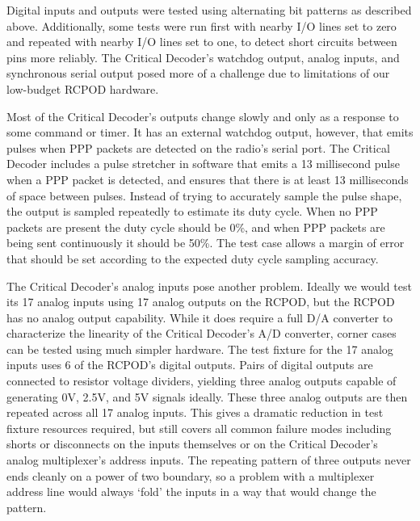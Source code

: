 \documentclass[letterpaper,twocolumn]{article}
\begin{document}
Digital inputs and outputs were tested using alternating bit patterns as described above. Additionally, some
tests were run first with nearby I/O lines set to zero and repeated with nearby I/O lines set to one, to detect
short circuits between pins more reliably. The Critical Decoder's watchdog output, analog inputs, and synchronous
serial output posed more of a challenge due to limitations of our low-budget RCPOD hardware.

Most of the Critical Decoder's outputs change slowly and only as a response to some command or timer. It has
an external watchdog output, however, that emits pulses when PPP packets are detected on the radio's serial port.
The Critical Decoder includes a pulse stretcher in software that emits a 13 millisecond pulse when a PPP
packet is detected, and ensures that there is at least 13 milliseconds of space between pulses. Instead of trying
to accurately sample the pulse shape, the output is sampled repeatedly to estimate its duty cycle. When no PPP
packets are present the duty cycle should be 0\%, and when PPP packets are being sent continuously it should
be 50\%. The test case allows a margin of error that should be set according to the expected duty cycle sampling
accuracy.

The Critical Decoder's analog inputs pose another problem. Ideally we would test its 17 analog inputs using 17
analog outputs on the RCPOD, but the RCPOD has no analog output capability. While it does require a full D/A converter
to characterize the linearity of the Critical Decoder's A/D converter, corner cases can be tested using much
simpler hardware. The test fixture for the 17 analog inputs uses 6 of the RCPOD's digital outputs. Pairs of
digital outputs are connected to resistor voltage dividers, yielding three analog outputs capable
of generating 0V, 2.5V, and 5V signals ideally. These three analog outputs are then repeated across all 17
analog inputs. This gives a dramatic reduction in test fixture resources required, but still covers all
common failure modes including shorts or disconnects on the inputs themselves or on the Critical Decoder's
analog multiplexer's address inputs. The repeating pattern of three outputs never ends cleanly on a power
of two boundary, so a problem with a multiplexer address line would always `fold' the inputs in a way that
would change the pattern.
\end{document}
